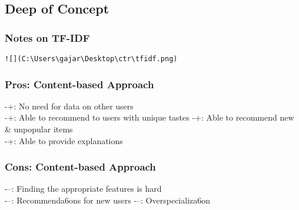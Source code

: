 \documentclass[
]{article}
\begin{document}
\hypertarget{deep-of-concept}{%
\subsection{Deep of Concept}\label{deep-of-concept}}

\hypertarget{notes-on-tf-idf}{%
\subsubsection{Notes on TF-IDF}\label{notes-on-tf-idf}}

\begin{verbatim}
![](C:\Users\gajar\Desktop\ctr\tfidf.png)
\end{verbatim}

\hypertarget{pros-content-based-approach}{%
\subsubsection{Pros: Content-based
Approach}\label{pros-content-based-approach}}

-+: No need for data on other users\\
-+: Able to recommend to users with unique tastes -+: Able to recommend
new \& unpopular items\\
-+: Able to provide explanations

\hypertarget{cons-content-based-approach}{%
\subsubsection{Cons: Content-based
Approach}\label{cons-content-based-approach}}

-\/--: Finding the appropriate features is hard\\
-\/--: Recommenda6ons for new users -\/--: Overspecializa6on
\end{document}
